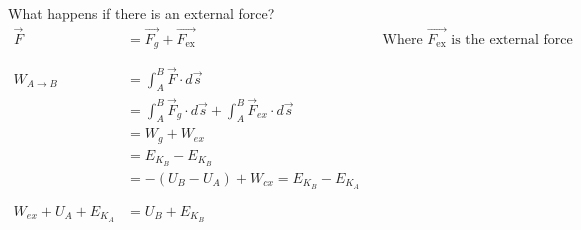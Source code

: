 \documentclass[12pt]{article}
\begin{document}
\vspace{4em}
What happens if there is an external force?
\begin{align*}
	\overrightarrow{F}     & = \overrightarrow{F_g} + \overrightarrow{F_\text{ex}}                                                                  &  & \text{Where } \overrightarrow{F_\text{ex}} \text{ is the external force} \\
	\phantom{=}                                                                                                                                                                                                                   \\
	W_{A \to B}            & = \int_A^B \overrightarrow{F} \cdot d\overrightarrow{s}                                                                                                                                              \\
	                       & = \int_A^B \overrightarrow{F}_g \cdot d\overrightarrow{s} + \int_A^B \overrightarrow{F}_{ex} \cdot d\overrightarrow{s}                                                                               \\
	                       & = W_g + W_{ex}                                                                                                                                                                                       \\
	                       & = E_{K_B} - E_{K_B}                                                                                                                                                                                  \\
	                       & = -(U_B - U_A) + W_{cx} = E_{K_B} - E_{K_A}                                                                                                                                                          \\
	\phantom{=}                                                                                                                                                                                                                   \\
	W_{ex} + U_A + E_{K_A} & = U_B + E_{K_B}
\end{align*}
\end{document}
